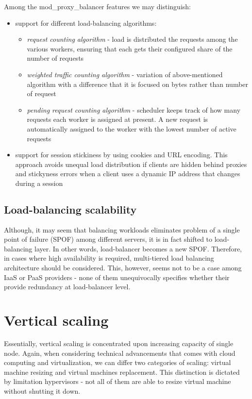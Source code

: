 Among the mod\_proxy\_balancer features we may distinguish:
\begin{itemize}
 \item support for different load-balancing algorithms:
    \begin{itemize}
      \item \textit{request counting algorithm} - load is distributed the requests among the various workers, ensuring that each gets their configured share of the number of requests
      \item \textit{weighted traffic counting algorithm} - variation of above-mentioned algorithm with a difference that it is focused on bytes rather than number of request
      \item \textit{pending request counting algorithm} - scheduler keeps track of how many requests each worker is assigned at present. A new request is automatically assigned to the worker with the lowest number of active requests
    \end{itemize}

 \item support for session stickiness by using cookies and URL encoding. This approach \cite{ApacheModProxyBalancer} avoids unequal load distribution if clients are hidden behind proxies and stickyness errors when a client uses a dynamic IP address that changes during a session
\end{itemize}

\subsection{Load-balancing scalability}
Although, it may seem that balancing workloads eliminates problem of a single point of failure (SPOF) among different servers, it is in fact shifted to load-balancing layer. In other words, load-balancer becomes a new SPOF. Therefore, in cases where high availability is required, multi-tiered load balancing architecture should be considered. This, however, seems not to be a case among IaaS or PaaS providers - none of them unequivocally specifies whether their provide redundancy at load-balancer level.

\section{Vertical scaling}
Essentially, vertical scaling is concentrated upon increasing capacity of single node. Again, when considering technical advancements that comes with cloud computing and virtualization, we can differ two categories of scaling: virtual machine resizing and virtual machines replacement. This distinction is dictated by limitation hypervisors - not all of them are able to resize virtual machine without shutting it down.

